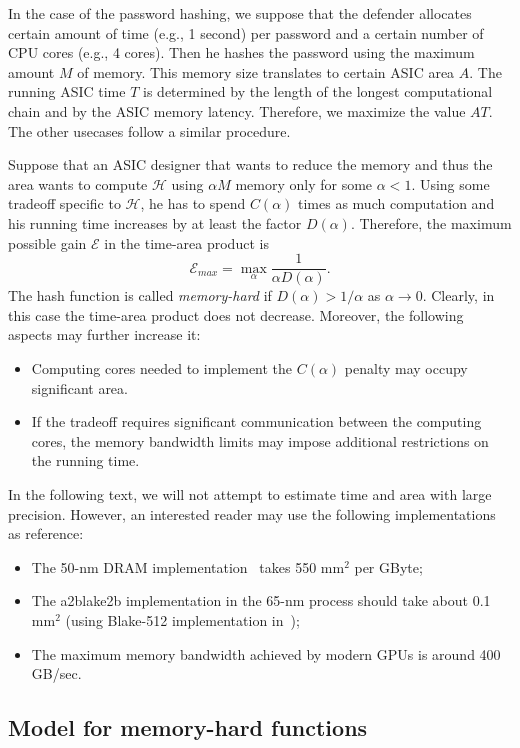 \documentclass[a4paper]{article}
\begin{document}
In the case of the password hashing, we suppose that the defender allocates certain amount of time (e.g., 1 second) per password and a certain number of CPU cores (e.g., 4 cores). Then he hashes the password using the maximum amount $M$ of memory. This memory size translates to certain ASIC area $A$. The running ASIC time $T$ is determined by the length of the longest computational chain and by the ASIC memory latency.
Therefore, we maximize the value $AT$. The other usecases follow a similar procedure. 

Suppose that an ASIC designer that wants to reduce the memory and thus the area wants to compute $\mathcal{H}$ using $\alpha M$ memory only for some $\alpha<1$. Using some tradeoff specific to $\mathcal{H}$, he has to spend $C(\alpha)$ times as much computation and his running time increases by at least the factor $D(\alpha)$. Therefore, the maximum possible gain $\mathcal{E}$ in the time-area product is 
$$
\mathcal{E}_{max}= \max_{\alpha}\frac{1}{\alpha D(\alpha)}.
$$
The hash function is called \emph{memory-hard} if $D(\alpha) >1/\alpha$ as $\alpha\rightarrow 0$. Clearly, in this case the time-area product does not decrease. Moreover, the following aspects may further increase it:
\begin{itemize}
\item Computing cores needed to implement the $C(\alpha)$ penalty may occupy significant area.
\item If the tradeoff requires significant communication between the computing cores, the memory bandwidth limits may impose additional restrictions on the running time.
\end{itemize}

In the following text, we will not attempt to  estimate  time and area with large precision. However, an interested reader may use the following implementations as reference:
 \begin{itemize}
   \item The 50-nm DRAM implementation~\cite{giridhar2013dram} takes 550 mm${}^2$ per GByte;
   \item The a2blake2b implementation in the 65-nm process should take about 0.1 mm${}^2$ (using Blake-512 implementation in~\cite{gurkaynak2012sha3});
   \item The maximum memory bandwidth achieved by modern GPUs is around 400 GB/sec.
 \end{itemize}
 
 \subsection{Model for memory-hard functions}
 
\end{document}
